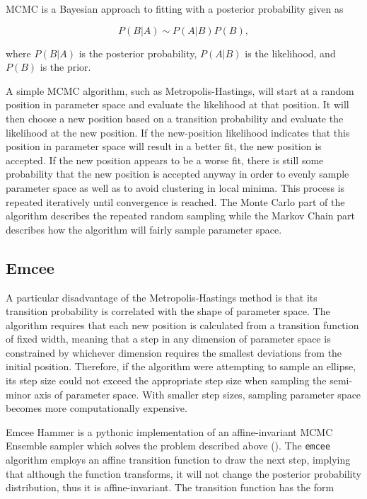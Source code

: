 MCMC is a Bayesian approach to fitting with a posterior probability given as

\begin{equation}
  \label{eq:linearfunc}
  P(B|A) \sim P(A|B)P(B),
\end{equation} 

where $P(B|A)$ is the posterior probability, $P(A|B)$ is the likelihood, and $P(B)$ is the prior.  
 
A simple MCMC algorithm, such as Metropolis-Hastings,  will start at a random position in parameter space and evaluate the likelihood at 
that position. It will then choose a new position based on a transition probability and evaluate the likelihood at the new position. 
If the new-position likelihood indicates that this position in parameter space will result in a better fit, the new position 
is accepted. If the new  position appears to be a worse fit, there is still some probability that the new position is accepted 
anyway in order to evenly sample parameter space as well as to avoid clustering in local minima. This process is repeated 
iteratively until convergence is reached. The Monte Carlo part of the algorithm describes the repeated random sampling while 
the Markov Chain part describes how the algorithm will fairly sample parameter space.

\subsection{Emcee}
\label{sec:emcee}

A particular disadvantage of the Metropolis-Hastings method is that its transition probability is correlated with the shape of 
parameter space. The algorithm requires that each new position is calculated from a transition function of fixed width, meaning that 
a step in any dimension of parameter space is constrained by whichever dimension requires the smallest deviations from the initial 
position. Therefore, if the algorithm were attempting to sample an ellipse, its step size could not exceed the appropriate step 
size when sampling the semi-minor axis of parameter space. With smaller step sizes, sampling parameter space becomes more 
computationally expensive. 

Emcee Hammer is a pythonic implementation of an affine-invariant MCMC Ensemble sampler which solves the problem 
described above (\citealp{foremanmackey2013}). The \texttt{emcee} algorithm employs an affine transition function 
to draw the next step, implying that although the 
function transforms, it will not change the posterior probability distribution, thus it is affine-invariant. The transition function has 
the form 

